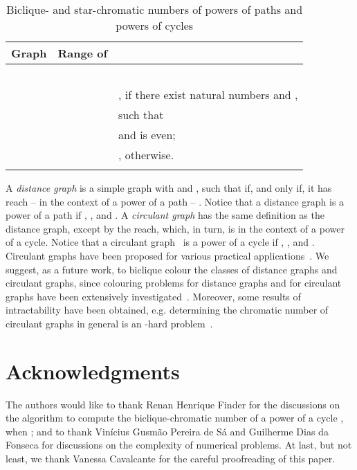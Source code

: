 \documentclass{article}
\begin{document}
\begin{table}[h]
\begin{center}
\begin{tabular}{|c||l|p{3cm}|p{3cm}|}
\hline
  Graph  & Range of  &  &  \\ \hline\hline
  \multirow{3}{*}{} &  &  &  \\
  \cline{2-4}
   &  &  & \\
  \cline{2-4}
   &  &  &  \\
  \hline\hline
  \multirow{5}{*}{} &  &  &  \\
  \cline{2-4}
   &  &  &\\
  \cline{2-3}
   & \multirow{4}{*}{} & \multicolumn{2}{l|}{, if there
   exist natural numbers  and ,} \\
   & & \multicolumn{2}{l|}{such that } \\
   & & \multicolumn{2}{l|}{and  is
   even;} \\
  & & \multicolumn{2}{l|}{, otherwise.} \\
  \cline{2-4}
   &  &  & \\
  \hline
\end{tabular}
\caption{Biclique- and star-chromatic numbers of powers of paths and powers of cycles}
\label{t:tabela}
\end{center}
\end{table}

A \emph{distance graph}  is a simple graph with
 and , such
that  if, and only if, it has reach -- in the context
of a power of a path -- . Notice that a distance graph
 is a power of a path if , , and
. A \emph{circulant graph}  has the same
definition as the distance graph, except by the reach, which, in turn, is in
the context of a power of a cycle. Notice that a circulant
graph~ is a power of a cycle if , ,
and .
Circulant graphs have been proposed for various practical
applications~\cite{circulantgraphapplication}.
We suggest, as a future work, to biclique colour the classes of distance
graphs and circulant graphs, since colouring problems for distance graphs and
for circulant graphs have been extensively
investigated~\cite{MR2567972,MR1900685,MR1632015}.
Moreover, some results of intractability have been obtained, e.g. determining
the chromatic number of circulant graphs in general is an -hard
problem~\cite{MR1653503}.


\section*{Acknowledgments}
The authors would like to thank Renan Henrique Finder for the discussions on
the algorithm to compute the biclique-chromatic number of a power of a cycle
, when ; and to thank Vin{\'i}cius Gusm{\~a}o Pereira de
S{\'a} and Guilherme Dias da Fonseca for discussions on the complexity of
numerical problems. At last, but not least, we thank Vanessa Cavalcante for
the careful proofreading of this paper.





\end{document}
